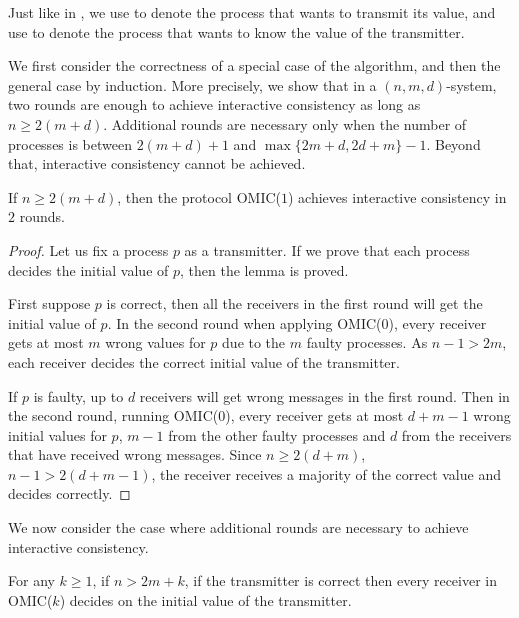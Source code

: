 Just like in
{\cite{lamport1982byzantine}}, we use  to denote the process
that wants to transmit its value, and use  to denote the process that wants to know the value of the transmitter. 

We first consider the correctness of a special case of the algorithm, and then 
the general case by induction.
More precisely, we show that in a $( n,m,d)$-system, two rounds are enough to achieve interactive consistency as long as 
$n \geqslant 2 ( m+d )$.
Additional rounds are necessary only when the number of processes is between $2 ( m+d ) + 1$ and $ \max \{ 2m+d,2d+m \}-1$. Beyond that, interactive consistency cannot be achieved.


\begin{lemma} \label{basicCase}
  \label{2roundlemma} If $n \geqslant 2 ( m+d )$, then the protocol OMIC($1$) achieves
  interactive consistency in $2$ rounds.
\end{lemma}

\begin{proof}
  Let us fix a process $p$ as a transmitter. If we prove that  each process decides  the
  initial value of $p$, then the lemma is proved.
  
  First suppose $p$ is correct, then all the receivers in the
  first round will get the initial value of $p$. In the second
  round when applying OMIC($0$), every receiver gets at most $m$ wrong
  values for $p$ due to the $m$ faulty processes.
As $n-1>2m$, each
  receiver decides the correct initial value of the transmitter.
  
  If $p$ is faulty, up to $d$ receivers will get wrong messages
  in the first round. Then in the second round, running OMIC($0$), every
  receiver gets at most $d+m-1$ wrong initial values for $p$,
  $m-1$ from the other faulty processes and $d$ from the receivers that have received wrong messages.
   Since $n\geqslant 2 (d+m)$, $n-1 > 2(d+m-1)$, the receiver receives a majority of the correct value and decides correctly.
\end{proof}

We now consider the case where additional rounds are necessary to achieve interactive consistency.

\begin{lemma} \label{reliableCorretness}
  \label{reliablecase}
  For any $k \geqslant 1$, if $n>2m+k$, if the transmitter is correct
 then every receiver in  OMIC($k$) decides on the initial value of the transmitter.
\end{lemma}

